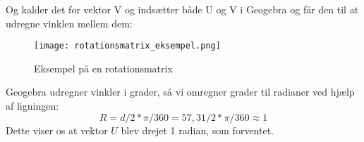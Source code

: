 Og kalder det for vektor V og indsætter både U og V i Geogebra og får den til at udregne vinklen mellem dem:
\begin{figure}
	\center\texttt{[image: rotationsmatrix\_eksempel.png]}
	\center\caption{Eksempel på en rotationsmatrix}
  \label{fig:rotationsmatrix_eksempel}
\end{figure}
Geogebra udregner vinkler i grader, så vi omregner grader til radianer ved hjælp af ligningen:
\begin{equation}
	R=d/2*\pi/360=57,31/2*\pi/360\approx1
\end{equation}
Dette viser os at vektor $U$ blev drejet 1 radian, som forventet.